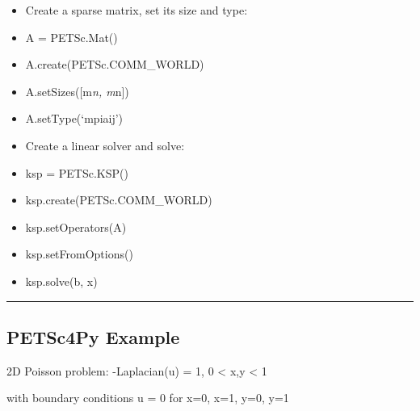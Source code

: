 \documentclass{article}
\begin{document}
\begin{itemize}
\itemsep1pt\parskip0pt
\item
  Create a sparse matrix, set its size and type:
\item
  A = PETSc.Mat()
\item
  A.create(PETSc.COMM\_WORLD)
\item
  A.setSizes({[}m\emph{n, m}n{]})
\item
  A.setType(`mpiaij')
\item
  Create a linear solver and solve:
\item
  ksp = PETSc.KSP()
\item
  ksp.create(PETSc.COMM\_WORLD)
\item
  ksp.setOperators(A)
\item
  ksp.setFromOptions()
\item
  ksp.solve(b, x)
\end{itemize}

    \begin{center}\rule{3in}{0.4pt}\end{center}

\subsection{PETSc4Py Example}\label{petsc4py-example}

2D Poisson problem: -Laplacian(u) = 1, 0 \textless{} x,y \textless{} 1

with boundary conditions u = 0 for x=0, x=1, y=0, y=1
\end{document}
